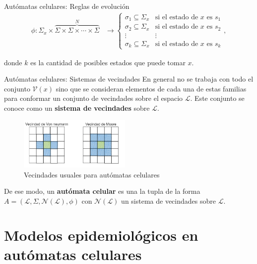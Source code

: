 \documentclass[9pt]{beamer}
\begin{document}
\begin{frame}{Autómatas celulares: Reglas de evolución}
\begin{align*}
    \phi:\Sigma_x\times\overbrace{\Sigma\times\Sigma\times\cdots\times\Sigma}^{N}&\longrightarrow \left\{ \begin{array}{cc}
    \sigma_1 \subseteq \Sigma_x & \text{si el estado de }x\text{ es }s_1 \\
    \sigma_2 \subseteq \Sigma_x & \text{si el estado de }x\text{ es }s_2 \\
    \vdots & \vdots \\
    \sigma_k \subseteq \Sigma_x & \text{si el estado de }x\text{ es }s_k
    \end{array} \right. ,
\end{align*}
    
donde $k$ es la cantidad de posibles estados que puede tomar $x$.
\end{frame}

\begin{frame}{Autómatas celulares: Sistemas de vecindades}
En general no se trabaja con todo el conjunto $\mathcal{V}(x)$ sino que se consideran elementos de cada una de estas familias para conformar un conjunto de vecindades sobre el espacio $\mathcal{L}$. Este conjunto se conoce como un \textbf{sistema de vecindades} sobre $\mathcal{L}$.

\begin{figure}[h]
  \centering
    \includegraphics[width=0.48\textwidth]{Imagenes/vecindades.PNG}
  \caption{Vecindades usuales para autómatas celulares}
  \label{fig:Moore - Von neumann}
\end{figure}    

De ese modo, un \textbf{autómata celular} es una la tupla de la forma  $A=(\mathcal{L},\Sigma,\mathcal{N}(\mathcal{L}),\phi)$ con $\mathcal{N}(\mathcal{L})$ un sistema de vecindades sobre $\mathcal{L}$.
\end{frame}

\section{Modelos epidemiológicos en autómatas celulares}
\end{document}
